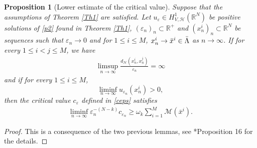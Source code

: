 \documentclass[a4paper]{amsart}
\newtheorem{proposition}{Proposition}[section]
\begin{document}
\begin{proposition}[Lower estimate of the critical value]\label{estim:sup}
 Suppose that the assumptions of Theorem \ref{Th1} are satisfied. Let $u_{\varepsilon}\in H^1_{V,\mathcal{H}}({\mathbb{R}}^N)$ be
positive solutions of \eqref{p2} found in Theorem \ref{Th1}, $(\varepsilon_n)_n \subset {\mathbb{R}}^+$ and $(x^i_n)_n \subset {\mathbb{R}}^N$
be sequences such that $\varepsilon_n \to 0$ and for $1\leq i \leq M$, $x^i_n\to
\bar{x}^i \in \Bar{\Lambda}$ as $n\to \infty$. If for every $1\leq i < j \leq M$, we have
\begin{align*}
 \limsup_{n\to\infty} \frac{d_{\mathcal{H}}(x^i_n,x^j_n)}{\varepsilon_n} = \infty
\end{align*}
and if for every $1\leq i \leq M$,
\[
 \liminf_{n\to\infty} u_{\varepsilon_n}(x^i_n) > 0,
\]
then the critical value $c_{\varepsilon}$ defined in \eqref{ceps} satisfies
 \begin{align*}
 \liminf_{n\to\infty} \varepsilon_n^{-(N-k)} c_{\varepsilon_n} \geq \omega_k \sum_{i=1}^M \mathcal{M}(\bar{x}^i).
 \end{align*}
\end{proposition}
\begin{proof}
This is a consequence of the two previous lemmas, see \cite{BVS}*{Proposition 16} for the details.
 \end{proof}
\end{document}
